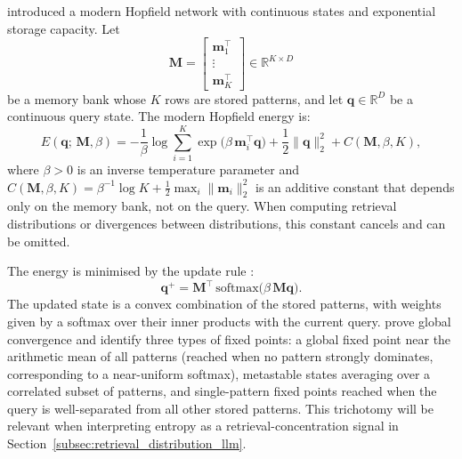 \citet{ramsauer2020hopfield} introduced a modern Hopfield network with continuous
states and exponential storage capacity. Let
\begin{equation}
    \mathbf{M}
    =
    \begin{bmatrix}
        \mathbf{m}_1^\top\\
        \vdots\\
        \mathbf{m}_K^\top
    \end{bmatrix}
    \in \mathbb{R}^{K \times D}
    \label{eq:generic_memory_bank}
\end{equation}
be a memory bank whose $K$ rows are stored patterns, and let $\mathbf{q} \in
\mathbb{R}^D$ be a continuous query state. The modern Hopfield energy is:
\begin{equation}
    E(\mathbf{q};\,\mathbf{M},\beta)
    =
    -\frac{1}{\beta}\log\sum_{i=1}^{K}
    \exp\!\bigl(\beta\,\mathbf{m}_i^{\top}\mathbf{q}\bigr)
    +\frac{1}{2}\|\mathbf{q}\|_2^{2}
    + C(\mathbf{M},\beta,K),
    \label{eq:modern_hopfield_energy}
\end{equation}
where $\beta > 0$ is an inverse temperature parameter and
$C(\mathbf{M},\beta,K) = \beta^{-1}\log K + \frac{1}{2}\max_i\|\mathbf{m}_i\|_2^2$
is an additive constant that depends only on the memory bank, not on the query. When
computing retrieval distributions or divergences between distributions, this constant
cancels and can be omitted.

The energy is minimised by the update rule \citep{ramsauer2020hopfield}:
\begin{equation}
    \mathbf{q}^{+}
    =
    \mathbf{M}^{\top}\,\mathrm{softmax}\!\bigl(\beta\,\mathbf{M}\mathbf{q}\bigr).
    \label{eq:modern_hopfield_update}
\end{equation}
The updated state is a convex combination of the stored patterns, with weights given
by a softmax over their inner products with the current query. \citet{ramsauer2020hopfield}
prove global convergence and identify three types of fixed points: a global fixed
point near the arithmetic mean of all patterns (reached when no pattern strongly
dominates, corresponding to a near-uniform softmax), metastable states averaging
over a correlated subset of patterns, and single-pattern fixed points reached when
the query is well-separated from all other stored patterns. This trichotomy will
be relevant when interpreting entropy as a retrieval-concentration signal in
Section~\ref{subsec:retrieval_distribution_llm}.

